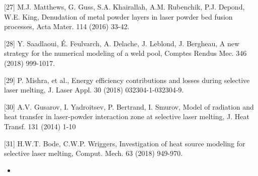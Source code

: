 \documentclass[10pt]{article}
\begin{document}
[27] M.J. Matthews, G. Guss, S.A. Khairallah, A.M. Rubenchik, P.J. Depond, W.E. King, Denudation of metal powder layers in laser powder bed fusion processes, Acta Mater. 114 (2016) 33-42.

[28] Y. Saadlaoui, É. Feulvarch, A. Delache, J. Leblond, J. Bergheau, A new strategy for the numerical modeling of a weld pool, Comptes Rendus Mec. 346 (2018) 999-1017.

[29] P. Mishra, et al., Energy efficiency contributions and losses during selective laser melting, J. Laser Appl. 30 (2018) 032304-1-032304-9.

[30] A.V. Gusarov, I. Yadroitsev, P. Bertrand, I. Smurov, Model of radiation and heat transfer in laser-powder interaction zone at selective laser melting, J. Heat Transf. 131 (2014) 1-10

[31] H.W.T. Bode, C.W.P. Wriggers, Investigation of heat source modeling for selective laser melting, Comput. Mech. 63 (2018) 949-970.

\begin{itemize}
  \item 
\end{itemize}
\end{document}
